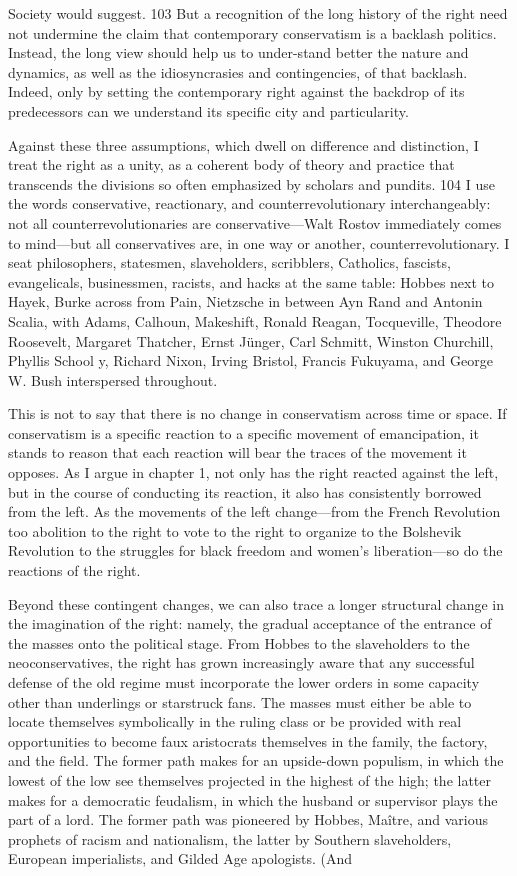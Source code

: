 Society would suggest. {\color{blue} 103 } But a recognition of the long history of the right need not undermine the claim that contemporary conservatism is a backlash politics. Instead, the long view should help us to under-stand better the nature and dynamics, as well as the idiosyncrasies and contingencies, of that backlash. Indeed, only by setting the contemporary right against the backdrop of its predecessors can we understand its specific city and particularity.{\par} Against these three assumptions, which dwell on difference and distinction, I treat the right as a unity, as a coherent body of theory and practice that transcends the divisions so often emphasized by scholars and pundits. {\color{blue} 104 } I use the words conservative, reactionary, and counterrevolutionary interchangeably: not all counterrevolutionaries are conservative—Walt Rostov immediately comes to mind—but all conservatives are, in one way or another, counterrevolutionary. I seat philosophers, statesmen, slaveholders, scribblers, Catholics, fascists, evangelicals, businessmen, racists, and hacks at the same table: Hobbes next to Hayek, Burke across from Pain, Nietzsche in between Ayn Rand and Antonin Scalia, with Adams, Calhoun, Makeshift, Ronald Reagan, Tocqueville, Theodore Roosevelt, Margaret Thatcher, Ernst Jünger, Carl Schmitt, Winston Churchill, Phyllis School y, Richard Nixon, Irving Bristol, Francis Fukuyama, and George W. Bush interspersed throughout.{\par} This is not to say that there is no change in conservatism across time or space. If conservatism is a specific reaction to a specific movement of emancipation, it stands to reason that each reaction will bear the traces of the movement it opposes. As I argue in chapter 1, not only has the right reacted against the left, but in the course of conducting its reaction, it also has consistently borrowed from the left. As the movements of the left change—from the French Revolution too abolition to the right to vote to the right to organize to the Bolshevik Revolution to the struggles for black freedom and women’s liberation—so do the reactions of the right.{\par} Beyond these contingent changes, we can also trace a longer structural change in the imagination of the right: namely, the gradual acceptance of the entrance of the masses onto the political stage. From Hobbes to the slaveholders to the neoconservatives, the right has grown increasingly aware that any successful defense of the old regime must incorporate the lower orders in some capacity other than underlings or starstruck fans. The masses must either be able to locate themselves symbolically in the ruling class or be provided with real opportunities to become faux aristocrats themselves in the family, the factory, and the field. The former path makes for an upside-down populism, in which the lowest of the low see themselves projected in the highest of the high; the latter makes for a democratic feudalism, in which the husband or supervisor plays the part of a lord. The former path was pioneered by Hobbes, Maître, and various prophets of racism and nationalism, the latter by Southern slaveholders, European imperialists, and Gilded Age apologists. (And 